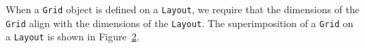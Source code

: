 \begin{figure}

\label{fig:layouts}
\end{figure}

When a {\tt Grid} object is defined on a {\tt Layout}, we require that the dimensions 
of the {\tt Grid} align with the dimensions of the {\tt Layout}.  The superimposition
of a {\tt Grid} on a {\tt Layout} is shown in Figure~\ref{fig:gridlayout}.

\begin{figure}
\label{fig:gridlayout}
\end{figure}

